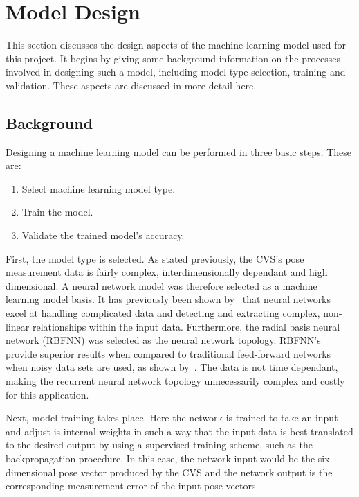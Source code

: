 \section{Model Design}

This section discusses the design aspects of the machine learning model used for this project. It begins by giving some background information on the processes involved in designing such a model, including model type selection, training and validation. These aspects are discussed in more detail here.  

\subsection{Background}

Designing a machine learning model can be performed in three basic steps. These are:

\begin{enumerate}
  \item Select machine learning model type.
  \item Train the model.
  \item Validate the trained model's accuracy. 
\end{enumerate}

First, the model type is selected. As stated previously, the CVS's pose measurement data is fairly complex, interdimensionally dependant and high dimensional. A neural network model was therefore selected as a machine learning model basis. It has previously been shown by~\cite{tu1996advantages} that neural networks excel at handling complicated data and detecting and extracting complex, non-linear relationships within the input data. Furthermore, the radial basis neural network (RBFNN) was selected as the neural network topology. RBFNN's provide superior results when compared to traditional feed-forward networks when noisy data sets are used, as shown by~\cite{xie2011comparison}. The data is not time dependant, making the recurrent neural network topology unnecessarily complex and costly for this application.  

Next, model training takes place. Here the network is trained to take an input and adjust is internal weights in such a way that the input data is best translated to the desired output by using a supervised training scheme, such as the backpropagation procedure. In this case, the network input would be the six-dimensional pose vector produced by the CVS and the network output is the corresponding measurement error of the input pose vectors.  

